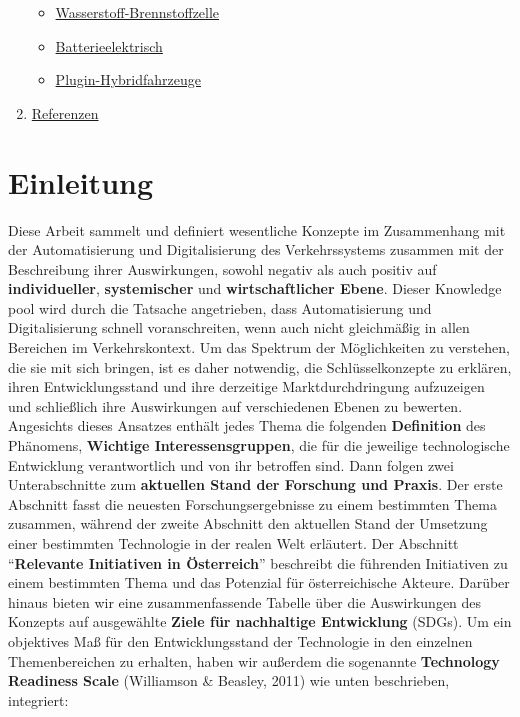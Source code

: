 \documentclass[
]{book}
\providecommand{\tightlist}{%
  \setlength{\itemsep}{0pt}\setlength{\parskip}{0pt}}
\begin{document}
\begin{enumerate}
  \begin{itemize}
  \tightlist
  \item
    \protect\hyperlink{FCEV}{Wasserstoff-Brennstoffzelle}\\
  \item
    \protect\hyperlink{bev}{Batterieelektrisch}\\
  \item
    \protect\hyperlink{plugin_hybrid}{Plugin-Hybridfahrzeuge}\\
  \end{itemize}
\item
  \protect\hyperlink{reference}{Referenzen}
\end{enumerate}

\hypertarget{intro}{%
\chapter{Einleitung}\label{intro}}

Diese Arbeit sammelt und definiert wesentliche Konzepte im Zusammenhang mit der Automatisierung und Digitalisierung des Verkehrssystems zusammen mit der Beschreibung ihrer Auswirkungen, sowohl negativ als auch positiv auf \textbf{individueller}, \textbf{systemischer} und \textbf{wirtschaftlicher Ebene}. Dieser Knowledge pool wird durch die Tatsache angetrieben, dass Automatisierung und Digitalisierung schnell voranschreiten, wenn auch nicht gleichmäßig in allen Bereichen im Verkehrskontext. Um das Spektrum der Möglichkeiten zu verstehen, die sie mit sich bringen, ist es daher notwendig, die Schlüsselkonzepte zu erklären, ihren Entwicklungsstand und ihre derzeitige Marktdurchdringung aufzuzeigen und schließlich ihre Auswirkungen auf verschiedenen Ebenen zu bewerten. Angesichts dieses Ansatzes enthält jedes Thema die folgenden \textbf{Definition} des Phänomens,
\textbf{Wichtige Interessensgruppen}, die für die jeweilige technologische Entwicklung verantwortlich und von ihr betroffen sind. Dann folgen zwei Unterabschnitte zum \textbf{aktuellen Stand der Forschung und Praxis}. Der erste Abschnitt fasst die neuesten Forschungsergebnisse zu einem bestimmten Thema zusammen, während der zweite Abschnitt den aktuellen Stand der Umsetzung einer bestimmten Technologie in der realen Welt erläutert. Der Abschnitt ``\textbf{Relevante Initiativen in Österreich}'' beschreibt die führenden Initiativen zu einem bestimmten Thema und das Potenzial für österreichische Akteure. Darüber hinaus bieten wir eine zusammenfassende Tabelle über die Auswirkungen des Konzepts auf ausgewählte \textbf{Ziele für nachhaltige Entwicklung} (SDGs). Um ein objektives Maß für den Entwicklungsstand der Technologie in den einzelnen Themenbereichen zu erhalten, haben wir außerdem die sogenannte \textbf{Technology Readiness Scale} (Williamson \& Beasley, 2011) wie unten beschrieben, integriert:
\end{document}
